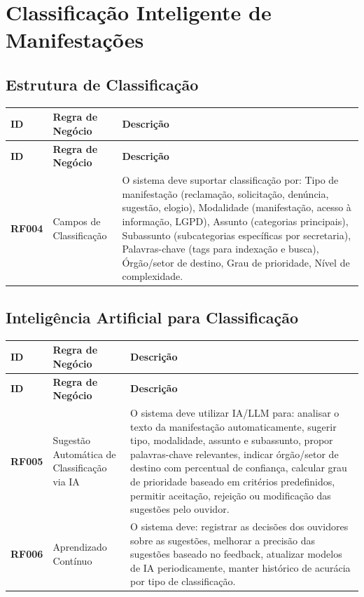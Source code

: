 \documentclass[12pt,a4paper]{article}
\newcommand{\rf}[1]{\textbf{\color{primaryblue}RF#1}}
\begin{document}
\section{Classificação Inteligente de Manifestações}

\subsection{Estrutura de Classificação}

\begin{longtable}{|p{2cm}|p{5cm}|p{8cm}|}
\hline
\textbf{ID} & \textbf{Regra de Negócio} & \textbf{Descrição} \\
\hline
\endfirsthead
\hline
\textbf{ID} & \textbf{Regra de Negócio} & \textbf{Descrição} \\
\hline
\endhead

\rf{004} & Campos de Classificação & O sistema deve suportar classificação por: Tipo de manifestação (reclamação, solicitação, denúncia, sugestão, elogio), Modalidade (manifestação, acesso à informação, LGPD), Assunto (categorias principais), Subassunto (subcategorias específicas por secretaria), Palavras-chave (tags para indexação e busca), Órgão/setor de destino, Grau de prioridade, Nível de complexidade. \\
\hline

\end{longtable}

\subsection{Inteligência Artificial para Classificação}

\begin{longtable}{|p{2cm}|p{5cm}|p{8cm}|}
\hline
\textbf{ID} & \textbf{Regra de Negócio} & \textbf{Descrição} \\
\hline
\endfirsthead
\hline
\textbf{ID} & \textbf{Regra de Negócio} & \textbf{Descrição} \\
\hline
\endhead

\rf{005} & Sugestão Automática de Classificação via IA & O sistema deve utilizar IA/LLM para: analisar o texto da manifestação automaticamente, sugerir tipo, modalidade, assunto e subassunto, propor palavras-chave relevantes, indicar órgão/setor de destino com percentual de confiança, calcular grau de prioridade baseado em critérios predefinidos, permitir aceitação, rejeição ou modificação das sugestões pelo ouvidor. \\
\hline

\rf{006} & Aprendizado Contínuo & O sistema deve: registrar as decisões dos ouvidores sobre as sugestões, melhorar a precisão das sugestões baseado no feedback, atualizar modelos de IA periodicamente, manter histórico de acurácia por tipo de classificação. \\
\hline

\end{longtable}
\end{document}
